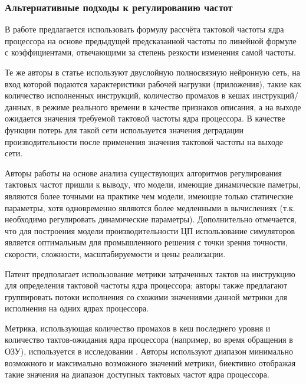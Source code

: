 \subsubsection{Альтернативные подходы к регулированию частот}

    В работе \cite{liang2013performance} предлагается использовать формулу рассчёта тактовой частоты
    ядра процессора на основе предыдущей предсказанной частоты по линейной формуле с коэффициентами,
    отвечающими за степень резкости изменения самой частоты.

    Те же авторы в статье
    \cite{chen2018learning} используют двуслойную полносвязную нейронную сеть, на вход которой
    подаются характеристики рабочей нагрузки (приложения), такие как количество исполненных инструкций,
    количество промахов в кешах инструкций/данных, в режиме реального времени в качестве
    признаков описания, а на выходе ожидается значения требуемой тактовой частоты ядра процессора.
    В качестве функции потерь для такой сети используется значения деградации производительности после
    применения значения тактовой частоты на выходе сети.

    Авторы работы \cite{haririan2020dvfs} на основе анализа существующих алгоритмов регулирования
    тактовых частот пришли к выводу, что модели, имеющие динамические паметры, являются более точными
    на практике чем модели, имеющие только статические параметры, хотя одновременно являются более
    медленными в вычислениях (т.к. необходимо регулировать динамические параметры). Дополнительно
    отмечается, что для построения модели производительности ЦП использование симуляторов является
    оптимальным для промышленного решения с точки зрения точности, скорости, сложности,
    масштабируемости и цены реализации.

    Патент \cite{johnson2012frequency} предполагает использование метрики затраченных тактов на
    инструкцию для определения тактовой частоты ядра процессора; авторы также предлагают
    группировать потоки исполнения со схожими значениями данной метрики для исполнения на
    одних ядрах процессора.

    Метрика, использующая количество промахов в кеш последнего уровня и количество тактов-ожидания
    ядра процессора (например, во время обращения в ОЗУ), используется в исследовании \cite{hebbar2022pmu}.
    Авторы используют диапазон минимально возможного и максимально возможного значений метрики,
    биективно отображая такие значения на диапазон доступных тактовых частот ядра процессора.

